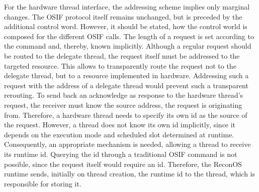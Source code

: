 For the hardware thread interface, the addressing scheme implies only marginal
changes. The \ac{OSIF} protocol itself remains unchanged, but is preceded by
the additional control word. However, it should be stated, how the control
world is composed for the different \ac{OSIF} calls. The length of a request
is set according to the command and, thereby, known implicitly. Although a
regular request should be routed to the delegate thread, the request itself
must be addressed to the targeted resource. This allows to transparently route
the request not to the delegate thread, but to a resource implemented in
hardware. Addressing such a request with the address of a delegate thread
would prevent such a transparent rerouting. To send back an acknowledge as
response to the hardware thread's request, the receiver must know the source
address, the request is originating from. Therefore, a hardware thread needs
to specify its own id as the source of the request. However, a thread does not
know its own id implicitly, since it depends on the execution mode and
scheduled slot determined at runtime. Consequently, an appropriate mechanism
is needed, allowing a thread to receive its runtime id. Querying the id
through a traditional \ac{OSIF} command is not possible, since the request
itself would require an id. Therefore, the ReconOS runtime sends, initially
on thread creation, the runtime id to the thread, which is responsible for
storing it.

